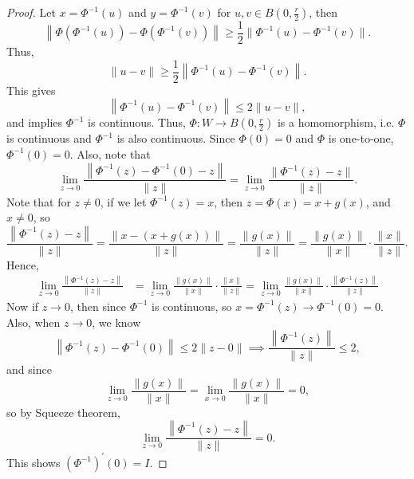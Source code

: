 \begin{proof}
    Let \(x = \Phi ^{-1}(u)\) and \(y = \Phi ^{-1}(v)\) for \(u, v \in B\left( 0, \frac{r}{2} \right) \), then 
    \[
        \left\lVert \Phi \left( \Phi ^{-1}(u) \right) - \Phi \left( \Phi ^{-1}(v) \right)   \right\rVert \ge \frac{1}{2} \lVert \Phi ^{-1}(u) - \Phi ^{-1}(v) \rVert.  
    \]                
    Thus,
    \[
        \lVert u - v \rVert \ge \frac{1}{2} \left\lVert \Phi ^{-1}(u) - \Phi ^{-1}(v) \right\rVert. 
    \]
    This gives
    \[
        \left\lVert \Phi ^{-1}(u) - \Phi ^{-1}(v) \right\rVert \le 2 \lVert u - v \rVert,
    \]
    and implies \(\Phi ^{-1}\) is continuous. Thus, \(\Phi :W \to B\left( 0, \frac{r}{2} \right) \) is a homomorphism, i.e. \(\Phi \) is continuous and \(\Phi ^{-1}\) is also continuous. Since \(\Phi (0) = 0\) and \(\Phi \) is one-to-one, \(\Phi ^{-1} (0) = 0\). Also, note that 
    \[
        \lim_{z \to 0} \frac{\left\lVert \Phi ^{-1}(z) - \Phi ^{-1}(0) - z \right\rVert }{\lVert z \rVert } = \lim_{z \to 0} \frac{\lVert \Phi ^{-1}(z) - z \rVert }{\lVert z \rVert }.  
    \]     
    Note that for \(z \neq 0\), if we let \(\Phi ^{-1}(z) = x\), then \(z = \Phi (x) = x + g(x)\), and \(x \neq 0\), so 
    \[
        \frac{\left\lVert \Phi ^{-1}(z) - z \right\rVert }{\lVert z \rVert } = \frac{\left\lVert x - (x + g(x)) \right\rVert }{\lVert z \rVert } = \frac{\lVert g(x) \rVert }{\lVert z \rVert } = \frac{\lVert g(x) \rVert }{\lVert x \rVert } \cdot \frac{\lVert x \rVert }{\lVert z \rVert }.
    \]    
    Hence, 
    \begin{align*}
        \lim_{z \to 0} \frac{\left\lVert \Phi ^{-1}(z) - z \right\rVert }{\lVert z \rVert } &= \lim_{z \to 0} \frac{\lVert g(x) \rVert }{\lVert x \rVert } \cdot \frac{\lVert x \rVert }{\lVert z \rVert } = \lim_{z \to 0} \frac{\lVert g(x) \rVert }{\lVert x \rVert } \cdot \frac{\left\lVert \Phi ^{-1}(z) \right\rVert }{\lVert z \rVert }   
    \end{align*}
    Now if \(z \to 0\), then since \(\Phi ^{-1}\) is continuous, so \(x = \Phi ^{-1}(z) \to \Phi ^{-1}(0) = 0\). Also, when \(z \to 0\), we know 
    \[
        \left\lVert \Phi ^{-1}(z) - \Phi ^{-1}(0) \right\rVert \le 2 \lVert z - 0 \rVert \implies \frac{\left\lVert \Phi ^{-1}(z) \right\rVert }{\lVert z \rVert } \le 2,
    \]    
    and since
    \[
        \lim_{z \to 0} \frac{\lVert g(x) \rVert }{\lVert x \rVert } = \lim_{x \to 0} \frac{\lVert g(x) \rVert }{\lVert x \rVert } = 0,  
    \]
    so by Squeeze theorem, 
    \[
       \lim_{z \to 0} \frac{\left\lVert \Phi ^{-1}(z) - z \right\rVert }{\lVert z \rVert } = 0. 
    \]
    This shows \(\left( \Phi ^{-1} \right)^ {\prime} (0) = I\). 

\end{proof}
